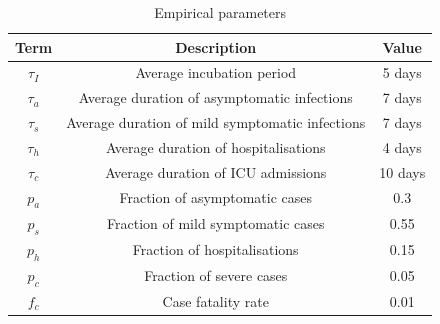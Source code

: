 \documentclass{article}
\begin{document}
\FloatBarrier
\begin{table}[htp]
\caption{Empirical parameters}
\begin{center}
\begin{tabular}{|c|c|c|}
\hline
Term & Description & Value  						 \\  \hline
$\tau_I$ & Average incubation period & 5 days 				 \\
$\tau_a$ & Average duration of asymptomatic infections & 7 days 	 \\ 
$\tau_s$ & Average duration of mild symptomatic infections & 7 days 	 \\
$\tau_h$ & Average duration of hospitalisations & 4 days 		 \\
$\tau_c$ & Average duration of ICU admissions & 10 days 		 \\
$p_a$ & Fraction of asymptomatic cases & 0.3 				 \\
$p_s$ & Fraction of mild symptomatic cases & 0.55 			 \\
$p_h$ & Fraction of hospitalisations & 0.15 				 \\
$p_c$ & Fraction of severe cases & 0.05 				 \\
$f_c$ & Case fatality rate & 0.01 					 \\
\hline
\end{tabular}
\end{center}
\label{basic-seir:params}
\end{table}%
\end{document}
